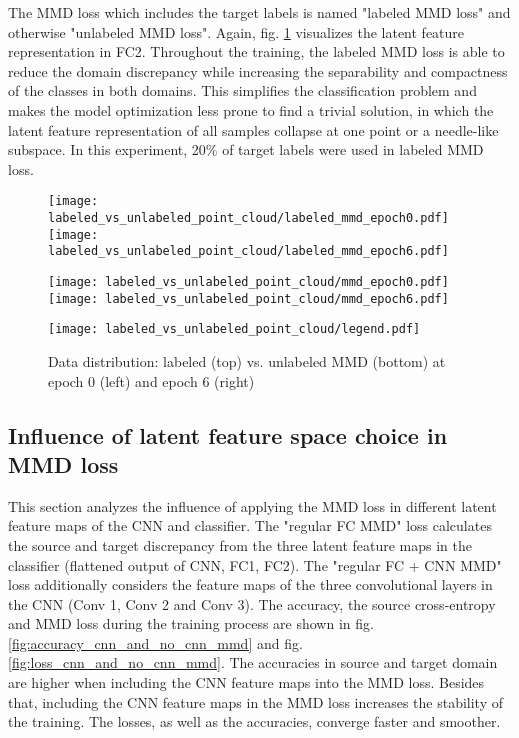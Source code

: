  The MMD loss which includes the target labels is named "labeled MMD loss" and otherwise "unlabeled MMD loss". Again, fig. \ref{fig:point_cloud_labeled_unlabeled_mmd} visualizes the latent feature representation in FC2. Throughout the training, the labeled MMD loss is able to reduce the domain discrepancy while increasing the separability and compactness of the classes in both domains. This simplifies the classification problem and makes the model optimization less prone to find a trivial solution, in which the latent feature representation of all samples collapse at one point or a needle-like subspace. In this experiment, 20\% of target labels were used in labeled MMD loss.
\begin{figure}[H]
  \centering
  \texttt{[image: labeled\_vs\_unlabeled\_point\_cloud/labeled\_mmd\_epoch0.pdf]}
  \hspace{.3cm}
  \texttt{[image: labeled\_vs\_unlabeled\_point\_cloud/labeled\_mmd\_epoch6.pdf]}

  \vspace{.1cm}

  \texttt{[image: labeled\_vs\_unlabeled\_point\_cloud/mmd\_epoch0.pdf]}
  \hspace{.1cm}
  \texttt{[image: labeled\_vs\_unlabeled\_point\_cloud/mmd\_epoch6.pdf]}

  \vspace{.1cm}
  
  \texttt{[image: labeled\_vs\_unlabeled\_point\_cloud/legend.pdf]}

  \caption{Data distribution: labeled (top) vs. unlabeled MMD (bottom) at epoch 0 (left) and epoch 6 (right)}
  \label{fig:point_cloud_labeled_unlabeled_mmd}
\end{figure}

\subsection{Influence of latent feature space choice in MMD loss}
\label{cnn_mmd_dummy}
This section analyzes the influence of applying the MMD loss in different latent feature maps of the CNN and classifier. The "regular FC MMD" loss calculates the source and target discrepancy from the three latent feature maps in the classifier (flattened output of CNN, FC1, FC2). The "regular FC + CNN MMD" loss additionally considers the feature maps of the three convolutional layers in the CNN (Conv 1, Conv 2 and Conv 3). The accuracy, the source cross-entropy and MMD loss during the training process are shown in fig. \ref{fig:accuracy_cnn_and_no_cnn_mmd} and fig. \ref{fig:loss_cnn_and_no_cnn_mmd}. The accuracies in source and target domain are higher when including the CNN feature maps into the MMD loss. Besides that, including the CNN feature maps in the MMD loss increases the stability of the training. The losses, as well as the accuracies, converge faster and smoother.

